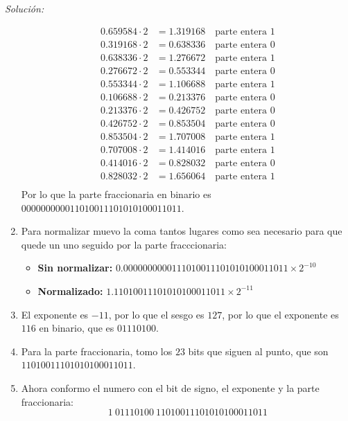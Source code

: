 \documentclass{article}
\newenvironment{solution}
    {\textit{Solución:}}
    {}
\begin{document}
\begin{solution}
\begin{enumerate}
\begin{align*}
        0.659584 \cdot 2 &= 1.319168 \quad \text{parte entera } 1\\
        0.319168 \cdot 2 &= 0.638336 \quad \text{parte entera } 0\\
        0.638336 \cdot 2 &= 1.276672 \quad \text{parte entera } 1\\
        0.276672 \cdot 2 &= 0.553344 \quad \text{parte entera } 0\\
        0.553344 \cdot 2 &= 1.106688 \quad \text{parte entera } 1\\
        0.106688 \cdot 2 &= 0.213376 \quad \text{parte entera } 0\\
        0.213376 \cdot 2 &= 0.426752 \quad \text{parte entera } 0\\
        0.426752 \cdot 2 &= 0.853504 \quad \text{parte entera } 0\\
        0.853504 \cdot 2 &= 1.707008 \quad \text{parte entera } 1\\
        0.707008 \cdot 2 &= 1.414016 \quad \text{parte entera } 1\\
        0.414016 \cdot 2 &= 0.828032 \quad \text{parte entera } 0\\
        0.828032 \cdot 2 &= 1.656064 \quad \text{parte entera } 1\\
    \end{align*}
    Por lo que la parte fraccionaria en binario es $000000000011010011101010100011011$.
    \item Para normalizar muevo la coma tantos lugares como sea necesario para que quede un uno seguido por la parte fracccionaria:
        \begin{itemize}
            \item \textbf{Sin normalizar:} $0.0000000000111010011101010100011011 \times 2^{-10}$
            \item \textbf{Normalizado:} $1.11010011101010100011011 \times 2^{-11}$
        \end{itemize}
    \item El exponente es $-11$, por lo que el sesgo es $127$, por lo que el exponente es $116$ en binario, que es $01110100$.
    \item Para la parte fraccionaria, tomo los $23$ bits que siguen al punto, que son $11010011101010100011011$.
    \item Ahora conformo el numero con el bit de signo, el exponente y la parte fraccionaria:
    \begin{equation*}
        1 \ 01110100 \ 11010011101010100011011
    \end{equation*}
    
\end{enumerate}
\end{solution}
\end{document}
